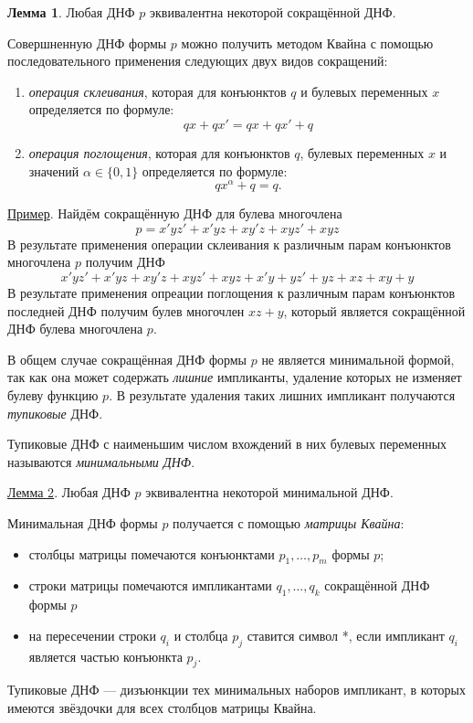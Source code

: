 \textbf{Лемма 1}. Любая ДНФ $p$ эквивалентна некоторой сокращённой ДНФ.

Совершненную ДНФ формы $p$ можно получить $\textit{методом Квайна}$ с помощью последовательного применения следующих двух видов сокращений:
\begin{enumerate}
    \item \textit{операция склеивания}, которая для конъюнктов $q$ и булевых переменных $x$ определяется по формуле: $$qx + qx' = qx + qx' + q$$
    \item \textit{операция поглощения}, которая для конъюнктов $q$, булевых переменных $x$ и значений $\alpha \in \{0, 1\}$ определяется по формуле: $$qx^\alpha + q = q.$$
\end{enumerate}

\underline{Пример}. Найдём сокращённую ДНФ для булева многочлена
$$p = x'yz' + x'yz + xy'z + xyz' + xyz$$
В результате применения операции склеивания к различным парам конъюнктов многочлена $p$ получим ДНФ
$$x'yz' + x'yz + xy'z + xyz' + xyz + x'y + yz' + yz + xz + xy + y$$
В результате применения опреации поглощения к различным парам конъюнктов последней ДНФ получим булев многочлен $xz + y$, который является сокращённой ДНФ булева многочлена $p$.

В общем случае сокращённая ДНФ формы $p$ не является минимальной формой, так как она может содержать \textit{лишние} импликанты, удаление которых не изменяет булеву функцию $p$. В результате удаления таких лишних импликант получаются \textit{тупиковые} ДНФ.

Тупиковые ДНФ с наименьшим числом вхождений в них булевых переменных называются \textit{минимальными ДНФ}.

\underline{Лемма 2}. Любая ДНФ $p$ эквивалентна некоторой минимальной ДНФ.

Минимальная ДНФ формы $p$ получается с помощью \textit{матрицы Квайна}:
\begin{itemize}
    \item столбцы матрицы помечаются конъюнктами $p_1, \dots, p_m$ формы $p$;
    \item строки матрицы помечаются импликантами $q_1,\dots,q_k$ сокращённой ДНФ формы $p$
    \item на пересечении строки $q_i$ и столбца $p_j$ ставится символ *, если импликант $q_i$ является частью конъюнкта $p_j$.
\end{itemize}

Тупиковые ДНФ --- дизъюнкции тех минимальных наборов импликант, в которых имеются звёздочки для всех столбцов матрицы Квайна.

